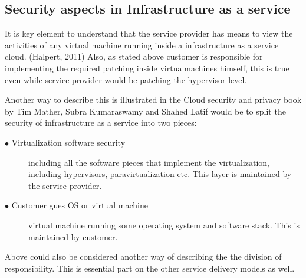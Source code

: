 \documentclass{article}
\begin{document}
\subsection{Security aspects in Infrastructure as a service}
It is key element to understand that the service provider has means to view the activities of any virtual machine running inside a infrastructure as a service cloud. (Halpert, 2011)
Also, as stated above customer is responsible for implementing the required patching inside virtualmachines himself, this is true even while service provider would be patching the hypervisor level.
\par
Another way to describe this is illustrated in the Cloud security and privacy book by Tim Mather, Subra Kumaraswamy and Shahed Latif would be to split the security of infrastructure as a service into two pieces:
\begin{description}
	\item[$\bullet$ Virtualization software security] including all the software pieces that implement the virtualization, including hypervisors, paravirtualization etc. This layer is maintained by the service provider.
	\item[$\bullet$ Customer gues OS or virtual machine] virtual machine running some operating system and software stack. This is maintained by customer.
\end{description}
Above could also be considered another way of describing the the division of responsibility. This is essential part on the other service delivery models as well.
\end{document}
